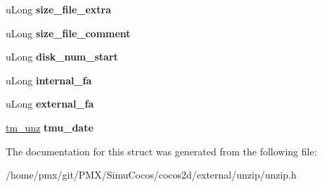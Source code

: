 \begin{DoxyCompactItemize}
\mbox{\label{structcocos2d_1_1unz__file__info64__s_a47da76f89d04cf7f15c4f70977cbb2cf}} 
u\+Long {\bfseries size\+\_\+file\+\_\+extra}
\item 
\mbox{\label{structcocos2d_1_1unz__file__info64__s_aba0c7c0a669922ff796c9f69ecfc6d55}} 
u\+Long {\bfseries size\+\_\+file\+\_\+comment}
\item 
\mbox{\label{structcocos2d_1_1unz__file__info64__s_ad1e5140664e1339a58a50e02d31b4872}} 
u\+Long {\bfseries disk\+\_\+num\+\_\+start}
\item 
\mbox{\label{structcocos2d_1_1unz__file__info64__s_aa765dc5183efa49e6597d28ed494db42}} 
u\+Long {\bfseries internal\+\_\+fa}
\item 
\mbox{\label{structcocos2d_1_1unz__file__info64__s_a37fb460ee903d6963920b533f3090aa3}} 
u\+Long {\bfseries external\+\_\+fa}
\item 
\mbox{\label{structcocos2d_1_1unz__file__info64__s_a2d52fe84e7e63f0dc59ba932294386b2}} 
\hyperlink{structcocos2d_1_1tm__unz__s}{tm\+\_\+unz} {\bfseries tmu\+\_\+date}
\end{DoxyCompactItemize}


The documentation for this struct was generated from the following file\+:\begin{DoxyCompactItemize}
\item 
/home/pmx/git/\+P\+M\+X/\+Simu\+Cocos/cocos2d/external/unzip/unzip.\+h\end{DoxyCompactItemize}
